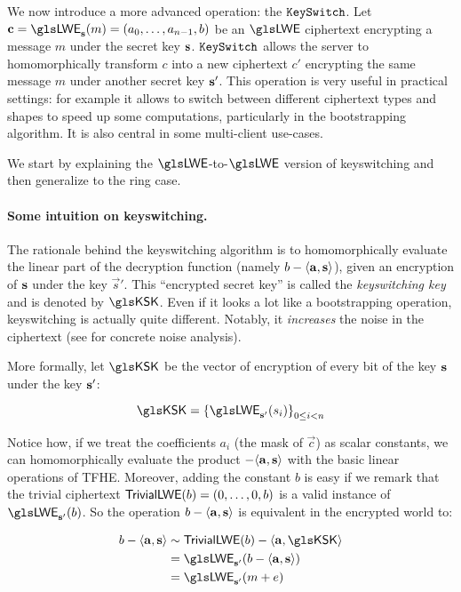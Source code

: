 We now introduce a more advanced operation: the $\texttt{KeySwitch}$. Let $\vec c = \LWE_{\lweSecretKey}(m) = (a_0, \dots, a_{n-1}, b)$ be an $\LWE$ ciphertext encrypting a message $m$ under the secret key $\mathbf s$. $\texttt{KeySwitch}$ allows the server to homomorphically transform $c$ into a new ciphertext $c'$ encrypting the same message $m$ under another secret key $\mathbf s'$. This operation is very useful in practical settings: for example it allows to switch between different ciphertext types and shapes to speed up some computations, particularly in the bootstrapping algorithm. It is also central in some multi-client use-cases.

We start by explaining the $\LWE$-to-$\LWE$ version of keyswitching and then generalize to the ring case.


\paragraph{Some intuition on keyswitching.}
The rationale behind the keyswitching algorithm is to homomorphically evaluate the linear part of the decryption function (namely $b - \langle \mathbf a, \mathbf s \rangle$), given an encryption of $\mathbf s$ under the key $\vec s'$. This ``encrypted secret key'' is called the \textit{keyswitching key} and is denoted by $\KSK$. Even if it looks a lot like a bootstrapping operation, keyswitching is actually quite different. Notably, it \textit{increases} the noise in the ciphertext (see \cite{JC:CGGI20, these_tap} for concrete noise analysis).


More formally, let $\KSK$ be the vector of encryption of every bit of the key $\mathbf s$ under the key $\mathbf s'$:

\[
	\KSK = \left \{ \LWE_{\lweSecretKey'}(s_i ) \right \}_{0 \le i < n}
\]

Notice how, if we treat the coefficients $a_i$ (the mask of $\vec c$) as scalar constants, we can homomorphically evaluate the product $- \langle \mathbf a ,\mathbf s \rangle$ with the basic linear operations of \gls{TFHE}. Moreover, adding the constant $b$ is easy if we remark that the trivial ciphertext $\textsf{TrivialLWE}(b) = (0, \dots, 0, b)$ is a valid instance of $\LWE_{\lweSecretKey'}(b)$. So the operation $b - \langle \mathbf a, \mathbf s \rangle$ is equivalent in the encrypted world to:


\begin{align*}
	b - \langle \vec a, \vec s \rangle &\sim \TrivialLWE(b) - \innerProduct{ \vec a}{\KSK}\\
	& = \LWE_{\lweSecretKey'}(b - \langle \vec a, \lweSecretKey \rangle)\\
		 &= \LWE_{\lweSecretKey'}(m + e)
\end{align*}


